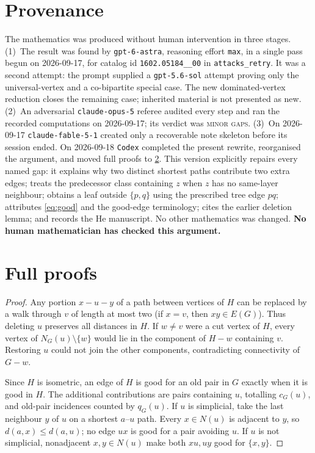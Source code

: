 \documentclass[11pt,a4paper]{article}
\theoremstyle{plain}
\theoremstyle{definition}
\theoremstyle{remark}
\begin{document}
\section{Provenance}\label{sec:provenance}
The mathematics was produced without human intervention in three stages.
(1)~The result was found by \texttt{gpt-6-astra}, reasoning effort
\texttt{max}, in a single pass begun on 2026-09-17, for catalog id
\texttt{1602.05184\_\_00} in \texttt{attacks\_retry}. It was a second
attempt: the prompt supplied a \texttt{gpt-5.6-sol} attempt proving only
the universal-vertex and a co-bipartite special case. The new
dominated-vertex reduction closes the remaining case; inherited material
is not presented as new.
(2)~An adversarial \texttt{claude-opus-5} referee audited every step and
ran the recorded computations on 2026-09-17; its verdict was
\textsc{minor gaps}.
(3)~On 2026-09-17 \texttt{claude-fable-5-1} created only a recoverable
note skeleton before its session ended. On 2026-09-18 \texttt{Codex}
completed the present rewrite, reorganised the argument, and moved full
proofs to \cref{app:proofs}. This version explicitly repairs
every named gap: it explains why two distinct shortest paths contribute
two extra edges; treats the predecessor class containing $z$ when $z$
has no same-layer neighbour; obtains a leaf outside $\{p,q\}$ using the
prescribed tree edge $pq$; attributes \eqref{eq:good} and the good-edge
terminology; cites the earlier deletion lemma; and records the He
manuscript. No other mathematics was changed.
\textbf{No human mathematician has checked this argument.}

\appendix
\section{Full proofs}\label{app:proofs}

\label{pf:dominated}
\lemdominated*
\begin{proof}
Any portion $x-u-y$ of a path between vertices of $H$ can be replaced by
a walk through $v$ of length at most two (if $x=v$, then $xy\in E(G)$).
Thus deleting $u$ preserves all distances in $H$. If $w\ne v$ were a cut
vertex of $H$, every vertex of $N_G(u)\setminus\{w\}$ would lie in the
component of $H-w$ containing $v$. Restoring $u$ could not join the other
components, contradicting connectivity of $G-w$.

Since $H$ is isometric, an edge of $H$ is good for an old pair in $G$
exactly when it is good in $H$. The additional contributions are pairs
containing $u$, totalling $c_G(u)$, and old-pair incidences counted by
$q_G(u)$. If $u$ is simplicial, take the last neighbour $y$ of $u$ on a
shortest $a$--$u$ path. Every $x\in N(u)$ is adjacent to $y$, so
$d(a,x)\le d(a,u)$; no edge $ux$ is good for a pair avoiding $u$. If $u$
is not simplicial, nonadjacent $x,y\in N(u)$ make both $xu,uy$ good for
$\{x,y\}$.
\end{proof}
\end{document}
